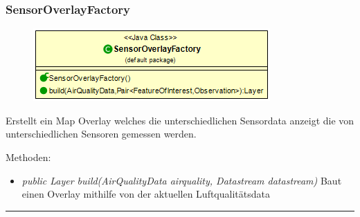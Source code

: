 \subsubsection{SensorOverlayFactory}
\begin{minipage}{0.3\textwidth}
    \begin{figure}[H]
        {\centering\includegraphics[scale = 0.5
        ]{media/view/factory/SensorOverlayFactory_Class.png}}
    \end{figure}
    \end{minipage} \hfill
    \begin{minipage}{0.6\textwidth}
        Erstellt ein Map Overlay welches die unterschiedlichen Sensordata anzeigt die von unterschiedlichen Sensoren gemessen werden.
\end{minipage}

 Methoden: \begin{itemize} [noitemsep]
    \item \emph{public Layer build(AirQualityData airquality,  Datastream datastream)} Baut einen Overlay mithilfe von der aktuellen Luftqualitätsdata
\end{itemize}

\rule{\textwidth}{0.4pt}

